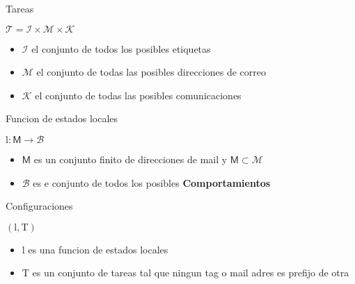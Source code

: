 \documentclass{beamer}
\begin{document}
\begin{frame}
  
  Tareas
  \begin{center}
    \Huge $\mathcal{T} = \mathcal{I} \times \mathcal{M} \times \mathcal{K}$ 
  \end{center}
  
  \begin{itemize}

  \item $\mathcal{I}$ el conjunto de todos los posibles etiquetas
  \item $\mathcal{M}$ el conjunto de todas las posibles direcciones de correo
  \item $\mathcal{K}$ el conjunto de todas las posibles comunicaciones
    
  \end{itemize}

  
\end{frame}

\begin{frame}
  
  Funcion de estados locales
  \begin{center}
    \Huge $ \mathrm{l} : \mathsf{M} \rightarrow \mathcal{B}$ 
  \end{center}
  
  \begin{itemize}

  \item $\mathsf{M}$ es un conjunto finito de direcciones de mail y $ \mathsf{M} \subset \mathcal{M} $ 
  \item $\mathcal{B}$ es e conjunto de todos los posibles \textbf{Comportamientos} 
    
  \end{itemize}

  
\end{frame}


\begin{frame}
   
  Configuraciones
  \begin{center}
    \Huge $ ( \mathrm{l}, \mathrm{T} ) $ 
  \end{center}
  
  \begin{itemize}
   

  \item $\mathrm{l}$ es una funcion de estados locales
  \item $\mathrm{T}$ es un conjunto de tareas tal que ningun tag o mail adres es prefijo de otra 
    
  \end{itemize}

  
\end{frame}
\end{document}
